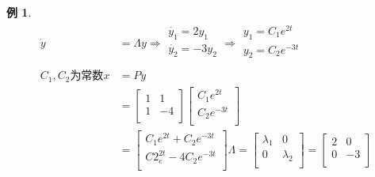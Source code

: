 \documentclass[12pt, a4paper, oneside]{ctexbook}
\newtheorem{example}[theorem]{例}
\begin{document}
\begin{example}
\begin{align}
        \dot y&=\Lambda y
        \Rightarrow
        \begin{matrix}        
            \dot {y_1} =2y_1 \\
            \dot {y_2} =-3y_2 \\
        \end{matrix}
        \Rightarrow
        \begin{matrix}
            y_1=C_1e^{2t} \\
            y_2=C_2e^{-3t} \\
        \end{matrix}
        \nonumber
        \\
        \mbox{$C_1,C_2$为常数}
        \nonumber
        x&=Py
        \nonumber
        \\
        &=
        \left[
            \begin{matrix}
                1 & 1 \\
                1 & -4 \\
            \end{matrix}
        \right]
        \left[
            \begin{matrix}
                C_1e^{2t} \\
                C_2e^{-3t} \\
            \end{matrix}
        \right]
        \nonumber
        \\
        &=
        \left[
            \begin{matrix}
                C_1e^{2t}+C_2e^{-3t} \\
                C2_e^{2t}-4C_2e^{-3t} \\
            \end{matrix}
        \right]
        \nonumber
        \Lambda=
        \left[
            \begin{matrix}
                \lambda_1 & 0 \\
                0 & \lambda_2 \\
            \end{matrix}
        \right]
        =
        \left[
            \begin{matrix}
                2 & 0 \\
                0 & -3 \\
            \end{matrix}
        \right]
    \end{align}

\end{example}
\end{document}
